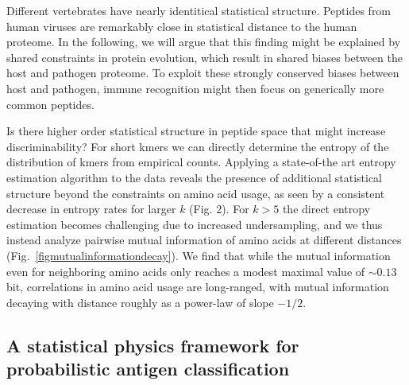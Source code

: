 \documentclass[superscriptaddress,twocolumn,pre]{revtex4}
\newcommand{\<}{\langle}
\renewcommand{\>}{\rangle}
\begin{document}
Different vertebrates have nearly identitical statistical structure. Peptides from human viruses are remarkably close in statistical distance to the human proteome. In the following, we will argue that this finding might be explained by shared constraints in protein evolution, which result in shared biases between the host and pathogen proteome. To exploit these strongly conserved biases between host and pathogen, immune recognition might then focus on generically more common peptides.

Is there higher order statistical structure in peptide space that might increase discriminability? For short kmers we can directly determine the entropy of the distribution of kmers from empirical counts. Applying a state-of-the art entropy estimation algorithm to the data reveals the presence of additional statistical structure beyond the constraints on amino acid usage, as seen by a consistent decrease in entropy rates for larger $k$  (Fig. 2). For $k > 5$ the direct entropy estimation becomes challenging due to increased undersampling, and we thus instead analyze pairwise mutual information of amino acids at different distances (Fig.~\ref{figmutualinformationdecay}). We find that while the mutual information even for neighboring amino acids only reaches a modest maximal value of $\sim 0.13$ bit, correlations in amino acid usage are long-ranged, with mutual information decaying with distance roughly as a power-law of slope $-1/2$. 

\subsection{A statistical physics framework for probabilistic antigen classification} 
\end{document}
